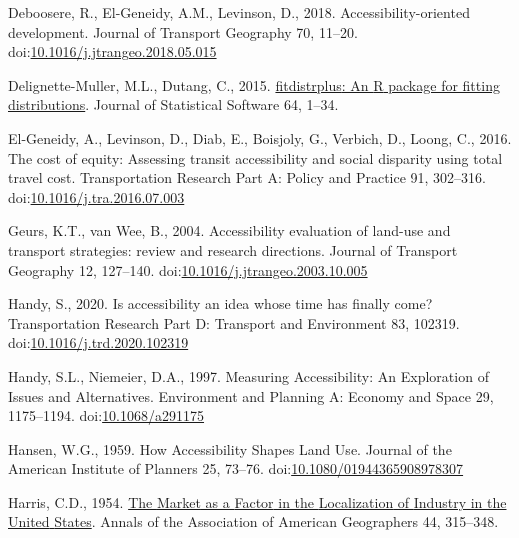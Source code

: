 \documentclass[]{elsarticle} %
\newlength{\cslhangindent}
\newlength{\cslentryspacingunit} %
\newenvironment{CSLReferences}[2] %
 {%
  \setlength{\parindent}{0pt}
  \ifodd #1
  \let\oldpar\par
  \def\par{\hangindent=\cslhangindent\oldpar}
  \fi
  \setlength{\parskip}{#2\cslentryspacingunit}
 }%
 {}
\begin{document}
\begin{CSLReferences}{1}{0}
\leavevmode{}%
Deboosere, R., El-Geneidy, A.M., Levinson, D., 2018.
Accessibility-oriented development. Journal of Transport Geography 70,
11--20.
doi:\href{https://doi.org/10.1016/j.jtrangeo.2018.05.015}{10.1016/j.jtrangeo.2018.05.015}

\leavevmode{}%
Delignette-Muller, M.L., Dutang, C., 2015.
\href{https://www.jstatsoft.org/article/view/v064i04}{{fitdistrplus}: An
{R} package for fitting distributions}. Journal of Statistical Software
64, 1--34.

\leavevmode{}%
El-Geneidy, A., Levinson, D., Diab, E., Boisjoly, G., Verbich, D.,
Loong, C., 2016. The cost of equity: {Assessing} transit accessibility
and social disparity using total travel cost. Transportation Research
Part A: Policy and Practice 91, 302--316.
doi:\href{https://doi.org/10.1016/j.tra.2016.07.003}{10.1016/j.tra.2016.07.003}

\leavevmode{}%
Geurs, K.T., van Wee, B., 2004. Accessibility evaluation of land-use and
transport strategies: review and research directions. Journal of
Transport Geography 12, 127--140.
doi:\href{https://doi.org/10.1016/j.jtrangeo.2003.10.005}{10.1016/j.jtrangeo.2003.10.005}

\leavevmode{}%
Handy, S., 2020. Is accessibility an idea whose time has finally come?
Transportation Research Part D: Transport and Environment 83, 102319.
doi:\href{https://doi.org/10.1016/j.trd.2020.102319}{10.1016/j.trd.2020.102319}

\leavevmode{}%
Handy, S.L., Niemeier, D.A., 1997. Measuring {Accessibility}: {An}
{Exploration} of {Issues} and {Alternatives}. Environment and Planning
A: Economy and Space 29, 1175--1194.
doi:\href{https://doi.org/10.1068/a291175}{10.1068/a291175}

\leavevmode{}%
Hansen, W.G., 1959. How Accessibility Shapes Land Use. Journal of the
American Institute of Planners 25, 73--76.
doi:\href{https://doi.org/10.1080/01944365908978307}{10.1080/01944365908978307}

\leavevmode{}%
Harris, C.D., 1954. \href{https://www.jstor.org/stable/2561395}{The
{Market} as a {Factor} in the {Localization} of {Industry} in the
{United} {States}}. Annals of the Association of American Geographers
44, 315--348.


\end{CSLReferences}
\end{document}
